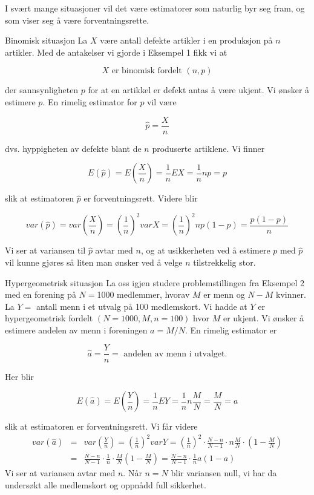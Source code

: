 I svært mange situasjoner vil det være estimatorer som naturlig
byr seg fram, og som viser seg å være forventningsrette.\\

\begin{eksempel}{Binomisk situasjon}
La $X$ være antall defekte artikler i en produksjon på $n$
artikler. Med de antakelser vi gjorde i Eksempel 1 fikk vi at

\[     X \mbox{\ \  er binomisk fordelt $(n,p)$} \]

\noindent der sannsynligheten $p$ for at en artikkel er defekt antas å
 være ukjent. Vi ønsker å estimere $p$. En rimelig estimator for $p$
vil være

\[ \hat{p}=\frac{X}{n}  \]

\noindent dvs. hyppigheten av defekte blant de $n$ produserte artiklene. Vi
finner

\[ E(\hat{p})=E(\frac{X}{n})=\frac{1}{n} EX=\frac{1}{n}np=p \]

\noindent slik at estimatoren $\hat{p}$ er forventningsrett. Videre blir

\[ var(\hat{p})=var(\frac{X}{n})={(\frac{1}{n})}^2varX=
                            {(\frac{1}{n})}^2np(1-p)=\frac{p(1-p)}{n} \]

\noindent Vi ser at variansen til $\hat{p}$ avtar med $n$, og at usikkerheten
ved å estimere $p$ med $\hat{p}$ vil kunne gjøres så liten man
ønsker ved å velge $n$ tilstrekkelig stor.
\end{eksempel}

\begin{eksempel}{Hypergeometrisk situasjon}
La oss igjen studere problemstillingen fra Eksempel 2 med en
forening på $N=$1000 medlemmer, hvorav $M$ er menn og $N-M$
kvinner. La $Y=$ antall menn i et utvalg på 100 medlemskort. Vi
hadde at $Y$ er hypergeometrisk fordelt $(N=1000, M, n=100)$ hvor
$M$ er ukjent. Vi ønsker å estimere andelen av menn i foreningen
$a=M/N$. En rimelig estimator er

\[  \hat{a}=\frac{Y}{n}=\mbox{\ \ andelen av menn i utvalget.} \]

\noindent Her blir

\[ E(\hat{a})=E(\frac{Y}{n})=\frac{1}{n}EY=
                                      \frac{1}{n}n\frac{M}{N}=\frac{M}{N}=a \]

\noindent slik at estimatoren er forventningsrett. Vi får videre
\begin{eqnarray*}
 var(\hat{a})&=&var(\frac{Y}{n})={(\frac{1}{n})}^2varY={(\frac{1}{n})}^2 
                \cdot \frac{N-n}{N-1}\cdot n\frac{M}{N}\cdot (1-\frac{M}{N})\\
       &=&\frac{N-n}{N-1}\cdot \frac{1}{n}\cdot \frac{M}{N}(1-\frac{M}{N})=
            \frac{N-n}{N-1}\cdot \frac{1}{n}a(1-a) 
\end{eqnarray*}
\noindent Vi ser at variansen avtar med $n$. Når $n=N$ blir variansen null,
vi har da undersøkt alle medlemskort og oppnådd full sikkerhet.
\end{eksempel}

